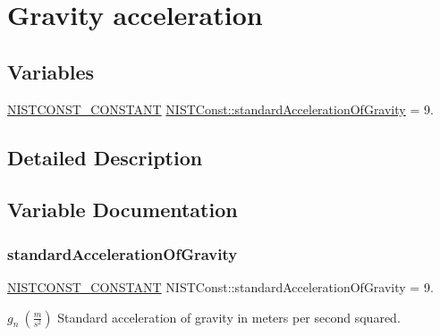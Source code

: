 \hypertarget{group___n_i_s_t_const-_gravity_acceleration}{}\section{Gravity acceleration}
\label{group___n_i_s_t_const-_gravity_acceleration}
\subsection*{Variables}
\begin{DoxyCompactItemize}
\item 
\mbox{\hyperlink{_n_i_s_t_const_8hpp_a2b0fc1d7452373f816175dd86ce26729}{N\+I\+S\+T\+C\+O\+N\+S\+T\+\_\+\+C\+O\+N\+S\+T\+A\+NT}} \mbox{\hyperlink{group___n_i_s_t_const-_gravity_acceleration_ga22b6c6320ba235b01a0c0a1b3f9fd043}{N\+I\+S\+T\+Const\+::standard\+Acceleration\+Of\+Gravity}} = 9.
\end{DoxyCompactItemize}


\subsection{Detailed Description}


\subsection{Variable Documentation}
\mbox{\label{group___n_i_s_t_const-_gravity_acceleration_ga22b6c6320ba235b01a0c0a1b3f9fd043}} 
\subsubsection{\texorpdfstring{standard\+Acceleration\+Of\+Gravity}{standardAccelerationOfGravity}}
{\footnotesize\ttfamily \mbox{\hyperlink{_n_i_s_t_const_8hpp_a2b0fc1d7452373f816175dd86ce26729}{N\+I\+S\+T\+C\+O\+N\+S\+T\+\_\+\+C\+O\+N\+S\+T\+A\+NT}} N\+I\+S\+T\+Const\+::standard\+Acceleration\+Of\+Gravity = 9.}

$g_n \ (\frac{m}{s^2})$ Standard acceleration of gravity in meters per second squared. 